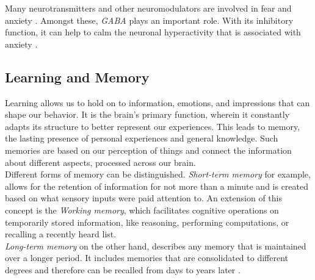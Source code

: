             Many neurotransmitters and other neuromodulators are involved in fear and anxiety \cite{Steimer.2002}. Amongst these, \textit{GABA} plays an important role. With its inhibitory function, it can help to calm the neuronal hyperactivity that is associated with anxiety \cite{thebrain-emotions-mollecular-a}.
        

    \subsection{Learning and Memory} 
    Learning allows us to hold on to information, emotions, and impressions that can shape our behavior. It is the brain's primary function, wherein it constantly adapts its structure to better represent our experiences. This leads to memory, the lasting presence of personal experiences and general knowledge.
    Such memories are based on our perception of things and connect the information about different aspects, processed across our brain.\\
    Different forms of memory can be distinguished. \textit{Short-term memory} for example, allows for the retention of information for not more than a minute and is created based on what sensory inputs were paid attention to. An extension of this concept is the \textit{Working memory}, which facilitates cognitive operations on temporarily stored information, like reasoning, performing computations, or recalling a recently heard list.\\ 
    \textit{Long-term memory} on the other hand, describes any memory that is maintained over a longer period. It includes memories that are consolidated to different degrees and therefore can be recalled from days to years later \cite{thebrain-memory-psychological-a}.

